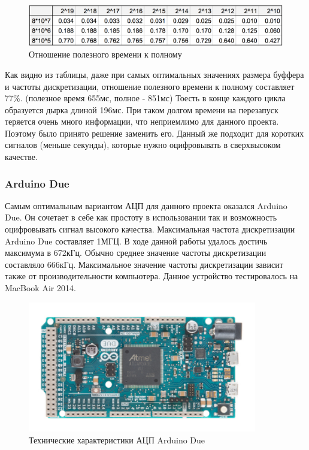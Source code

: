 \documentclass[../paper.tex]{subfiles}
\begin{document}
\begin{figure}[H]
\centering
\includegraphics[width=\textwidth]{images/bad-div-by-good.png}
\caption{Отношение полезного времени к полному}
\end{figure}

Как видно из таблицы, даже при самых оптимальных значениях размера буффера и частоты дискретизации, отношение полезного времени к полному составляет 77\%. (полезное время 655мс, полное -  851мс) Тоесть в конце каждого цикла образуется дырка длиной 196мс. При таком долгом времени на перезапуск теряется очень много информации, что неприемлимо для данного проекта. Поэтому было принято решение заменить его. Данный же подходит для коротких сигналов (меньше секунды), которые нужно оцифровывать в сверхвысоком качестве.

\subsubsection{Arduino Due}

Самым оптимальным вариантом АЦП для данного проекта оказался Arduino Due. Он сочетает в себе как простоту в использовании так и возможность оцифровывать сигнал высокого качества. Максимальная частота дискретизации Arduino Due составляет 1МГЦ. В ходе данной работы удалось достичь максимума в 672кГц. Обычно среднее значение частоты дискретизации составляло 666кГц. Максимальное значение частоты дискретизации зависит также от производительности компьютера. Данное устройство тестировалось на MacBook Air 2014.

\begin{figure}[H]
\centering
\includegraphics[width=10cm]{images/adc3}
\caption{Технические характеристики АЦП Arduino Due}
\end{figure}
\end{document}
